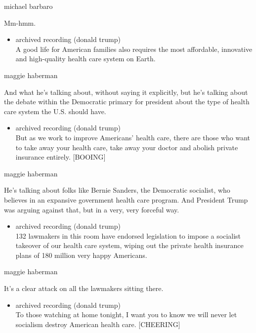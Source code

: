 michael barbaro

Mm-hmm.

\begin{itemize}
\tightlist
\item
  archived recording (donald trump)\\
  A good life for American families also requires the most affordable,
  innovative and high-quality health care system on Earth.
\end{itemize}

maggie haberman

And what he's talking about, without saying it explicitly, but he's
talking about the debate within the Democratic primary for president
about the type of health care system the U.S. should have.

\begin{itemize}
\tightlist
\item
  archived recording (donald trump)\\
  But as we work to improve Americans' health care, there are those who
  want to take away your health care, take away your doctor and abolish
  private insurance entirely. {[}BOOING{]}
\end{itemize}

maggie haberman

He's talking about folks like Bernie Sanders, the Democratic socialist,
who believes in an expansive government health care program. And
President Trump was arguing against that, but in a very, very forceful
way.

\begin{itemize}
\tightlist
\item
  archived recording (donald trump)\\
  132 lawmakers in this room have endorsed legislation to impose a
  socialist takeover of our health care system, wiping out the private
  health insurance plans of 180 million very happy Americans.
\end{itemize}

maggie haberman

It's a clear attack on all the lawmakers sitting there.

\begin{itemize}
\tightlist
\item
  archived recording (donald trump)\\
  To those watching at home tonight, I want you to know we will never
  let socialism destroy American health care. {[}CHEERING{]}
\end{itemize}

